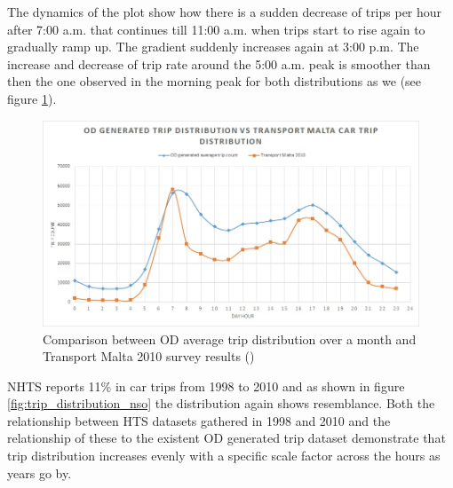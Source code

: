 \documentclass[12pt, a4paper]{report}
\theoremstyle{definition}
\theoremstyle{definition}%
\theoremstyle{definition}%
\theoremstyle{definition}%
\theoremstyle{definition}%
\theoremstyle{definition}%
\begin{document}
The dynamics of the plot show how there is a sudden decrease of trips per hour after 7:00 a.m. that continues till 11:00 a.m. when trips start to rise again to gradually ramp up. The gradient suddenly increases again at 3:00 p.m. The increase and decrease of trip rate around the 5:00 a.m. peak is smoother than then the one observed in the morning peak for both distributions as we (see figure \ref{fig:trip_count_correlation}). 


\begin{figure}[!]	
	\includegraphics[scale=0.6]{Trip_count_correlation.jpg}
	\centering
	\caption[Comparison between NHTS and OD average trip distribution ]{Comparison between OD average trip distribution over a month and Transport Malta 2010 survey results (\cite{malta2011national})}
	\label{fig:trip_count_correlation}
\end{figure}


NHTS \cite{malta2011national} reports 11\% in car trips from 1998 to 2010 and as shown in figure \ref{fig:trip_distribution_nso} the distribution again shows resemblance. Both the relationship between HTS datasets gathered in 1998 and 2010 and the relationship of these to the existent OD generated trip dataset demonstrate that trip distribution increases evenly with a specific scale factor across the hours as years go by.
\end{document}
